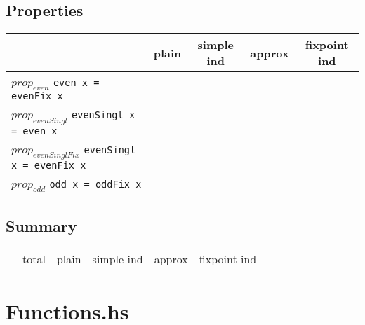 \documentclass{article}
\begin{document}
\subsection*{Properties}
\begin{longtable}{p{10cm} || c | c | c | c | }
  & plain & simple ind & approx & fixpoint ind \\
\hline
$prop_{even}$ \newline \verb`even x = evenFix x` &  &  &  &  \\
\hline
$prop_{evenSingl}$ \newline \verb`evenSingl x = even x` &  &  &  &  \\
\hline
$prop_{evenSinglFix}$ \newline \verb`evenSingl x = evenFix x` &  &  &  &  \\
\hline
$prop_{odd}$ \newline \verb`odd x = oddFix x` &  &  &  &  \\
\end{longtable}

\subsection*{Summary}
\begin{longtable}{p{4cm} || c | c | c | c | c | }
  & total & plain & simple ind & approx & fixpoint ind \\
\end{longtable}

\section*{Functions.hs}
\end{document}
